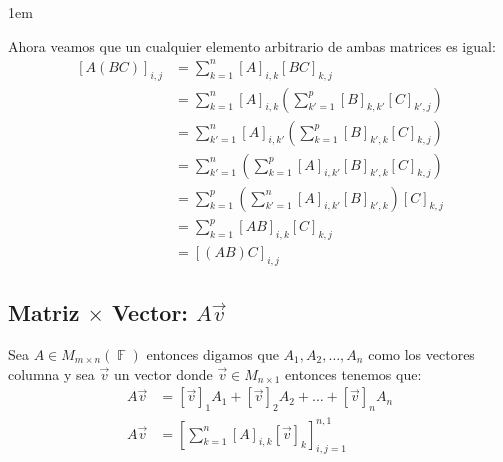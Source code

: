 \documentclass[12pt, fleqn]{report}                             %
\newenvironment{SmallIndentation}[1][0.75em]                    %
        {\begin{adjustwidth}{#1}{}\begin{footnotesize}}             %
        {\end{footnotesize}\end{adjustwidth}}                       %
\theoremstyle{break}                                            %
\DeclareMathOperator \GenericField {\mathbb{F}}                 %
\newcommand{\Brackets}[1]    {\left[ #1 \right]}                %
\newcommand{\Wrap}[1]    {\left( #1 \right)}                    %
\begin{document}
\begin{itemize}
\begin{SmallIndentation}[1em]
                            Ahora veamos que un cualquier elemento arbitrario de ambas matrices es igual:
                            \begin{equation*}
                            \begin{split}
                                [A(BC)]_{i, j}    
                                    &= \sum_{k=1}^n [A]_{i, k} [BC]_{k, j}                                      \\
                                    &= \sum_{k=1}^n [A]_{i, k}   \Wrap{\sum_{k'=1}^p [B]_{k, k'} [C]_{k', j} }  \\
                                    &= \sum_{k'=1}^n [A]_{i, k'} \Wrap{\sum_{k=1}^p  [B]_{k', k} [C]_{k, j} }   \\
                                    &= \sum_{k'=1}^n \Wrap{\sum_{k=1}^p [A]_{i, k'} [B]_{k', k} [C]_{k, j} }    \\
                                    &= \sum_{k=1}^p \Wrap{\sum_{k'=1}^n [A]_{i,k'} [B]_{k',k} } [C]_{k, j}      \\
                                    &= \sum_{k=1}^p [AB]_{i, k} [C]_{k, j}                                      \\
                                    &= [(AB)C]_{i, j}
                            \end{split}
                            \end{equation*}

                        \end{SmallIndentation}

                \end{itemize}




            \clearpage
            \subsection{Matriz $\times$ Vector: $A\vec{v}$}
                
                Sea $A \in M_{m \times n}(\GenericField)$ entonces digamos que $A_1, A_2, \dots, A_n$
                como los vectores columna y sea $\vec{v}$ un vector donde $\vec{v} \in M_{n \times 1}$
                entonces tenemos que:
                \begin{align*}
                    A\vec{v} &= [\vec{v}]_1 A_1 + [\vec{v}]_2 A_2 + \dots + [\vec{v}]_n A_n             \\
                    A\vec{v} &= \Brackets{ \sum_{k=1}^{n} [A]_{i, k} [\vec{v}]_k }_{i, j = 1}^{n, 1}
                \end{align*}
\end{document}
